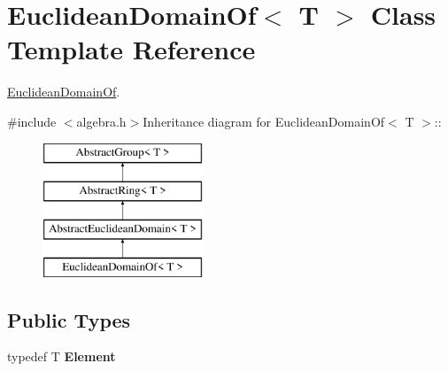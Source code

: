 \hypertarget{class_euclidean_domain_of}{
\section{EuclideanDomainOf$<$ T $>$ Class Template Reference}
\label{class_euclidean_domain_of}
}


\hyperlink{class_euclidean_domain_of}{EuclideanDomainOf}.  


{\ttfamily \#include $<$algebra.h$>$}Inheritance diagram for EuclideanDomainOf$<$ T $>$::\begin{figure}[H]
\begin{center}
\leavevmode
\includegraphics[height=4cm]{class_euclidean_domain_of}
\end{center}
\end{figure}
\subsection*{Public Types}
\begin{DoxyCompactItemize}
\item 
\hypertarget{class_euclidean_domain_of_aa7ae3206185edccff8c2e7d56eb9d47b}{
typedef T {\bfseries Element}}
\label{class_euclidean_domain_of_aa7ae3206185edccff8c2e7d56eb9d47b}

\end{DoxyCompactItemize}
